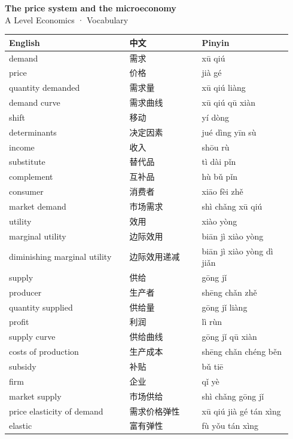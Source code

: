 \documentclass[11pt]{article}
\begin{document}
\begin{center}
  {\LARGE\bfseries The price system and the microeconomy}\\[0.35em]
  {\large A Level Economics · Vocabulary}
\end{center}
\vspace{0.6em}

\begin{longtable}{@{}p{0.40\linewidth}p{0.24\linewidth}p{0.30\linewidth}@{}}
\toprule
\textbf{English} & \textbf{中文} & \textbf{Pinyin} \\
\midrule
\endhead
\bottomrule
\endlastfoot
demand & 需求 & xū qiú \\
price & 价格 & jià gé \\
quantity demanded & 需求量 & xū qiú liàng \\
demand curve & 需求曲线 & xū qiú qū xiàn \\
shift & 移动 & yí dòng \\
determinants & 决定因素 & jué dìng yīn sù \\
income & 收入 & shōu rù \\
substitute & 替代品 & tì dài pǐn \\
complement & 互补品 & hù bǔ pǐn \\
consumer & 消费者 & xiāo fèi zhě \\
market demand & 市场需求 & shì chǎng xū qiú \\
utility & 效用 & xiào yòng \\
marginal utility & 边际效用 & biān jì xiào yòng \\
diminishing marginal utility & 边际效用递减 & biān jì xiào yòng dì jiǎn \\
supply & 供给 & gōng jǐ \\
producer & 生产者 & shēng chǎn zhě \\
quantity supplied & 供给量 & gōng jǐ liàng \\
profit & 利润 & lì rùn \\
supply curve & 供给曲线 & gōng jǐ qū xiàn \\
costs of production & 生产成本 & shēng chǎn chéng běn \\
subsidy & 补贴 & bǔ tiē \\
firm & 企业 & qǐ yè \\
market supply & 市场供给 & shì chǎng gōng jǐ \\
price elasticity of demand & 需求价格弹性 & xū qiú jià gé tán xìng \\
elastic & 富有弹性 & fù yǒu tán xìng \\

\end{longtable}
\end{document}
